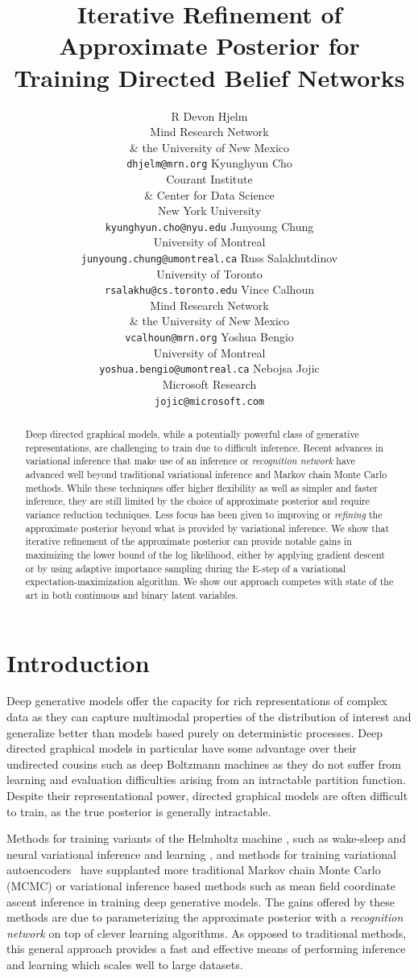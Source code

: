 \documentclass{article} %
\title{Iterative Refinement of \\ Approximate Posterior for \\ Training Directed Belief Networks}
\author{R Devon Hjelm \\
Mind Research Network \\ \& the University of New Mexico \\
\texttt{\small dhjelm@mrn.org} 
\And
Kyunghyun Cho \\
Courant Institute \\ \& Center for Data Science \\
New York University \\
\texttt{\small kyunghyun.cho@nyu.edu}
\And
Junyoung Chung \\
University of Montreal \\
\texttt{\small junyoung.chung@umontreal.ca}
\And
Russ Salakhutdinov \\
University of Toronto \\
\texttt{\small rsalakhu@cs.toronto.edu}
\And
Vince Calhoun \\
Mind Research Network \\ \& the University of New Mexico \\
\texttt{\small vcalhoun@mrn.org}
\And
Yoshua Bengio \\
University of Montreal \\
\texttt{\small yoshua.bengio@umontreal.ca}
\And
Nebojsa Jojic \\
Microsoft Research \\
\texttt{\small jojic@microsoft.com}
}
\begin{document}
\maketitle

\begin{abstract}
    Deep directed graphical models, while a potentially powerful
    class of generative representations, are challenging to train due to difficult inference. Recent advances in variational inference that make use
    of an inference or \emph{recognition network} have advanced well beyond
    traditional variational inference and Markov chain Monte Carlo methods. While these techniques
    offer higher flexibility as well as simpler and faster inference, they are
    still limited by the choice of approximate posterior and require variance
    reduction techniques. Less focus has been given to improving or \emph{refining} the
    approximate posterior beyond what is provided by variational inference. We
    show that iterative refinement of the approximate posterior can provide
    notable gains in maximizing the lower bound of the log likelihood, either
    by applying gradient descent or by using adaptive importance sampling
    during the E-step of a variational expectation-maximization algorithm. We show our approach
    competes with state of the art in both continuous and binary latent
    variables.
    \end{abstract}

\section{Introduction}

Deep generative models offer the capacity for rich representations of complex
data as they can capture multimodal properties of the distribution of
interest and generalize better than models based purely on deterministic processes. Deep directed
graphical models in particular have some advantage over their undirected
cousins such as deep Boltzmann machines \citep[DBMs,][]{salakhutdinov2009deep} as they do not suffer from
learning and evaluation difficulties arising from an intractable partition
function. Despite their representational power, directed graphical models are
often difficult to train, as the true posterior is generally intractable.

Methods for training variants of the Helmholtz machine
\citep{dayan1995helmholtz}, such as wake-sleep \citep{hinton1995wake,
bornschein2014reweighted} and neural variational inference and learning
\citep[NVIL,][]{mnih2014neural}, and methods for training variational
autoencoders~ \citep[VAE,][]{kingma2013auto} have supplanted more traditional
Markov chain Monte Carlo (MCMC) \citep{neal1992connectionist} or variational
inference based methods such as mean field coordinate ascent inference
\citep{saul1996mean} in training deep generative models. The gains offered by
these methods are due to parameterizing the approximate posterior with a
\emph{recognition network} on top of clever learning algorithms. As opposed to
traditional methods, this general approach provides a fast and effective means
of performing inference and learning which scales well to large datasets.
\end{document}
